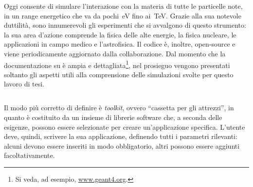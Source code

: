 Oggi \geant{} consente di simulare l'interazione con la materia di tutte le particelle note, in un range energetico che va da pochi~eV fino ai~TeV.
%
Grazie alla sua notevole duttilità, sono innumerevoli gli esperimenti che si avvalgono di questo strumento: la sua area d'azione comprende la fisica delle alte energie, la fisica nucleare, le applicazioni in campo medico e l'astrofisica.
Il codice è, inoltre, open-source e viene periodicamente aggiornato dalla collaborazione. 
Dal momento che la documentazione su \geant{} è ampia e dettagliata\footnote{Si veda, ad esempio, \url{www.geant4.org}.}, nel prosieguo vengono presentati soltanto gli aspetti utili alla comprensione delle simulazioni svolte per questo lavoro di tesi.  




\subsection{}

Il modo più corretto di definire \geant{} è \emph{toolkit}, ovvero ``cassetta per gli attrezzi'', in quanto è costituito da un insieme di librerie software che, a seconda delle esigenze, possono essere selezionate per creare un'applicazione specifica.
L'utente deve, quindi, scrivere la sua applicazione, definendo tutti i parametri rilevanti: alcuni devono essere inseriti in modo obbligatorio, altri possono essere aggiunti facoltativamente.

